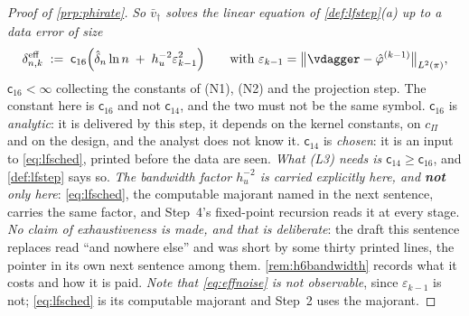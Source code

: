 \begin{proof}[Proof of \cref{prp:phirate}]
\emph{So $\bar v_\dagger$ solves the linear equation of \cref{def:lfstep}(a) up to a data error of size}
\begin{equation}\label{eq:effnoise}
\delta^{\mathrm{eff}}_{n,k}\;:=\;\mathsf c_{16}\Big(\hat\delta_n\ln n\;+\;h_u^{-2}\varepsilon_{k-1}^{2}\Big)
\qquad\text{with }\varepsilon_{k-1}=\big\|\vdagger-\hat\varphi^{(k-1)}\big\|_{L^{2}(\pi)} ,
\end{equation}
$\mathsf c_{16}<\infty$ collecting the constants of (N1), (N2) and the projection step.
The constant here is $\mathsf c_{16}$ and not $\mathsf c_{14}$, and the two must not be the same
symbol. $\mathsf c_{16}$ is \emph{analytic}: it is delivered by this step, it depends on the kernel
constants, on $c_\Pi$ and on the design, and the analyst does not know it. $\mathsf c_{14}$ is
\emph{chosen}: it is an input to \eqref{eq:lfsched}, printed before the data are seen. \emph{What (L3)
needs is $\mathsf c_{14}\ge\mathsf c_{16}$}, and \cref{def:lfstep} says so.
\emph{The bandwidth factor $h_u^{-2}$ is carried explicitly here, and \textbf{not} only here}:
\eqref{eq:lfsched}, the computable majorant named in the next sentence, carries the same factor, and
Step~4's fixed-point recursion reads it at every stage. \emph{No claim of exhaustiveness is made,
and that is deliberate}: the draft this sentence replaces read ``and nowhere else'' and was short by
some thirty printed lines, the pointer in its own next sentence among them.
\cref{rem:h6bandwidth} records what it costs and how it is paid. \emph{Note that
\eqref{eq:effnoise} is not observable}, since $\varepsilon_{k-1}$ is not; \eqref{eq:lfsched} is its
computable majorant and Step~2 uses the majorant.


\end{proof}
